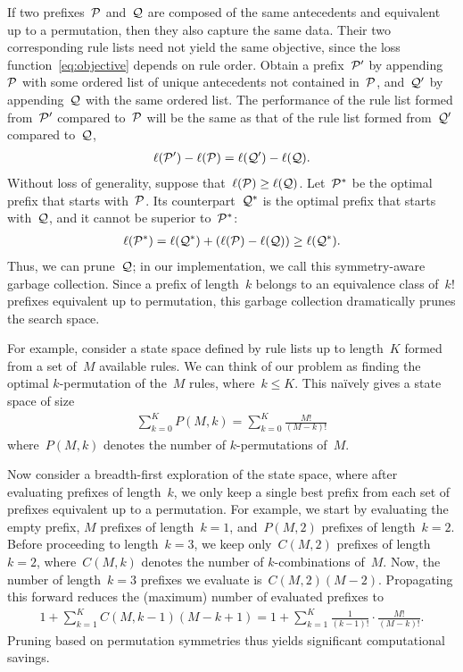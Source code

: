 If two prefixes~$\cal{P}$ and~$\cal{Q}$ are composed of the same antecedents and
equivalent up to a permutation, then they also capture the same data.
%
Their two corresponding rule lists need not yield the same objective, since the
loss function~\eqref{eq:objective} depends on rule order.
%
Obtain a prefix~$\cal{P}'$ by appending~$\cal{P}$ with some ordered list of
unique antecedents not contained in~$\cal{P}$, and~$\cal{Q}'$ by appending~$\cal{Q}$
with the same ordered list.
%
The performance of the rule list formed from~$\cal{P}'$ compared to~$\cal{P}$ will be
the same as that of the rule list formed from~$\cal{Q}'$ compared to~$\cal{Q}$, \ie
\begin{align}
\ell(\cal{P}') - \ell(\cal{P}) = \ell(\cal{Q}') - \ell(\cal{Q}).
\end{align}
Without loss of generality, suppose that~${\ell(\cal{P}) \ge \ell(\cal{Q})}$.
%
Let~$\cal{P}^*$ be the optimal prefix that starts with~$\cal{P}$.
%
Its counterpart~$\cal{Q}^*$ is the optimal prefix that starts with~$\cal{Q}$,
and it cannot be superior to~$\cal{P^*}$:
%
\begin{align}
\ell(\cal{P}^*) = \ell(\cal{Q^*}) + (\ell(\cal{P}) - \ell(\cal{Q})) \ge \ell(\cal{Q^*}).
\label{eq:permutation}
\end{align}
%
Thus, we can prune~$\cal{Q}$;
in our implementation, we call this symmetry-aware garbage collection.
%
Since a prefix of length~$k$ belongs to an equivalence class of~$k!$ prefixes
equivalent up to permutation, this garbage collection dramatically prunes the search space.

For example, consider a state space defined by rule lists up to length~$K$
formed from a set of~$M$ available rules.
%
We can think of our problem as finding the optimal $k$-permutation of the~$M$ rules,
where~${k \le K}$.
%
This na\"ively gives a state space of size
\begin{align}
\sum_{k=0}^K P(M, k) = \sum_{k=0}^K \frac{M!}{(M - k)!}
\end{align}
where~${P(M, k)}$ denotes the number of $k$-permutations of~$M$.

Now consider a breadth-first exploration of the state space,
where after evaluating prefixes of length~$k$, we only keep a single best prefix
from each set of prefixes equivalent up to a permutation.
%
For example, we start by evaluating the empty prefix,
$M$ prefixes of length~${k=1}$, and~${P(M, 2)}$ prefixes of length~${k=2}$.
%
Before proceeding to length~${k=3}$, we keep only~${C(M, 2)}$ prefixes of length~${k=2}$,
where~${C(M, k)}$ denotes the number of $k$-combinations of~$M$.
%
Now, the number of length~${k=3}$ prefixes we evaluate is~${C(M, 2) (M - 2)}$.
%
Propagating this forward reduces the (maximum) number of evaluated prefixes to
\begin{align}
1 + \sum_{k=1}^K C(M, k-1) (M - k + 1)
= 1 + \sum_{k=1}^K \frac{1}{(k - 1)!} \cdot \frac{M!}{(M - k)!}.
\end{align}
Pruning based on permutation symmetries thus yields significant computational savings.

